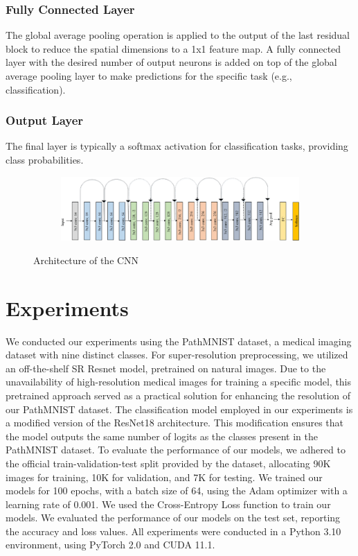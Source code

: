 \documentclass[10pt,twocolumn,letterpaper]{article}
\begin{document}
\subsubsection{Fully Connected Layer}
The global average pooling operation is applied to the output of the last residual block to reduce the spatial dimensions to a 1x1 feature map. A fully connected layer with the desired number of output neurons is added on top of the global average pooling layer to make predictions for the specific task (e.g., classification).

\subsubsection{Output Layer}
The final layer is typically a softmax activation for classification tasks, providing class probabilities.

\begin{figure}
    \centering
    \begin{subfigure}{0.5\textwidth}
        \includegraphics[width=\linewidth]{ResNet18 - 1.png}
    \end{subfigure}
    \caption{Architecture of the CNN}
    \label{fig:enter-label}
\end{figure}

\section{Experiments}
We conducted our experiments using the PathMNIST dataset, a medical imaging dataset with nine distinct classes. 
For super-resolution preprocessing, we utilized an off-the-shelf SR Resnet model, pretrained on natural images. Due to the unavailability of high-resolution medical images for training a specific model, this pretrained approach served as a practical solution for enhancing the resolution of our PathMNIST dataset.
The classification model employed in our experiments is a modified version of the ResNet18 architecture. This modification ensures that the model outputs the same number of logits as the classes present in the PathMNIST dataset.
To evaluate the performance of our models, we adhered to the official train-validation-test split provided by the dataset, allocating 90K images for training, 10K for validation, and 7K for testing.
We trained our models for 100 epochs, with a batch size of 64, using the Adam optimizer with a learning rate of 0.001. We used the Cross-Entropy Loss function to train our models.
We evaluated the performance of our models on the test set, reporting the accuracy and loss values. 
All experiments were conducted in a Python 3.10 environment, using PyTorch 2.0 and CUDA 11.1.
\end{document}
